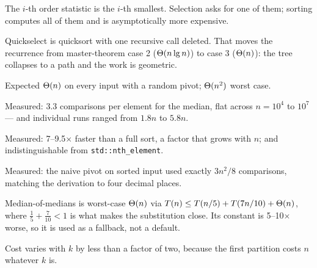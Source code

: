 \begin{chaptersummary}
\begin{tight}
  \item The $i$-th order statistic is the $i$-th smallest. Selection asks for
        one of them; sorting computes all of them and is asymptotically more
        expensive.
  \item Quickselect is quicksort with one recursive call deleted. That moves
        the recurrence from master-theorem case 2 ($\Theta(n\operatorname{lg} n)$) to case 3
        ($\Theta(n)$): the tree collapses to a path and the work is geometric.
  \item Expected $\Theta(n)$ on every input with a random pivot;
        $\Theta(n^{2})$ worst case.
  \item Measured: $3.3$ comparisons per element for the median, flat across
        $n = 10^{4}$ to $10^{7}$ --- and individual runs ranged from $1.8n$ to
        $5.8n$.
  \item Measured: 7--9.5$\times$ faster than a full sort, a factor that grows
        with $n$; and indistinguishable from \texttt{std::nth\_element}.
  \item Measured: the naive pivot on sorted input used exactly $3n^{2}/8$
        comparisons, matching the derivation to four decimal places.
  \item Median-of-medians is worst-case $\Theta(n)$ via $T(n) \le T(n/5) +
        T(7n/10) + \Theta(n)$, where $\tfrac15+\tfrac{7}{10}<1$ is what makes
        the substitution close. Its constant is 5--10$\times$ worse, so it is
        used as a fallback, not a default.
  \item Cost varies with $k$ by less than a factor of two, because the first
        partition costs $n$ whatever $k$ is.
\end{tight}
\end{chaptersummary}

